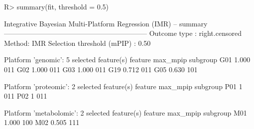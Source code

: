 \documentclass[article]{jss}
\begin{document}
\begin{CodeChunk}
\begin{CodeInput}
R> summary(fit, threshold = 0.5)
\end{CodeInput}
\begin{CodeOutput}
Integrative Bayesian Multi-Platform Regression (IMR) -- summary
--------------------------------------------------------------
Outcome type : right.censored   Method: IMR
Selection threshold (mPIP) : 0.50

Platform 'genomic': 5 selected feature(s)
 feature max_mpip subgroup
     G01    1.000      011
     G02    1.000      011
     G03    1.000      011
     G19    0.712      011
     G05    0.630      101

Platform 'proteomic': 2 selected feature(s)
 feature max_mpip subgroup
     P01        1      011
     P02        1      011

Platform 'metabolomic': 2 selected feature(s)
 feature max_mpip subgroup
     M01    1.000      100
     M02    0.505      111

\end{CodeOutput}
\end{CodeChunk}
\end{document}
